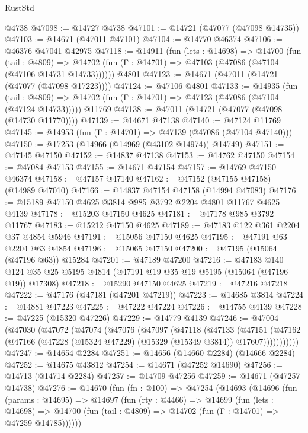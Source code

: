 \begin{lexlean}{RustStd}
\begin{coremodule}
    @4738
@47098 := @14727 @4738
@47101 := @14721 (@47077 (@47098 @14735))
@47103 := @14671 (@47011 @47101)
@47104 := @14770 @46374
@47106 := @46376 @47041 @42975
@47118 := @14911
    (fun (lets : @14698) =>
    @14700
      (fun (tail : @4809) =>
      @14702 (fun (Γ : @14701) => @47103 (@47086 (@47104 (@47106 @14731 @14733))))))
    @4801
@47123 := @14671 (@47011 (@14721 (@47077 (@47098 @17223))))
@47124 := @47106 @4801
@47133 := @14935
    (fun (tail : @4809) => @14702 (fun (Γ : @14701) => @47123 (@47086 (@47104 (@47124 @14733)))))
    @11769
@47138 := @47011 (@14721 (@47077 (@47098 (@14730 @11770))))
@47139 := @14671 @47138
@47140 := @47124 @11769
@47145 := @14953 (fun (Γ : @14701) => @47139 (@47086 (@47104 @47140)))
@47150 := @17253 (@14966 (@14969 (@43102 @14974)) @14749)
@47151 := @47145 @47150
@47152 := @14837 @47138
@47153 := @14762 @47150
@47154 := @47084 @47153
@47155 := @14671 @47154
@47157 := @14769 @47150 @46374
@47158 := @47157 @47140
@47162 := @47152 (@47155 @47158) (@14989 @47010)
@47166 := @14837 @47154 @47158 (@14994 @47083)
@47176 := @15189 @47150 @4625 @3814 @985 @3792 @2204 @4801 @11767 @4625 @4139
@47178 := @15203 @47150 @4625
@47181 := @47178 @985 @3792 @11767
@47183 := @15212 @47150 @4625
@47189 := @47183 @122 @361 @2204 @37 @4854 @5946
@47191 := @15056 @47150 @4625
@47195 := @47191 @63 @2204 @63 @4854
@47196 := @15065 @47150
@47200 := @47195 (@15064 (@47196 @63)) @15284
@47201 := @47189 @47200
@47216 := @47183
    @140
    @124
    @35
    @25
    @5195
    @4814
    (@47191 @19 @35 @19 @5195 (@15064 (@47196 @19)) @17308)
@47218 := @15290 @47150 @4625
@47219 := @47216 @47218
@47222 := @47176 (@47181 (@47201 @47219))
@47223 := @14685 @3814
@47224 := @14881 @47223
@47225 := @47222 @47224
@47226 := @14755 @4139
@47228 := @47225 (@15320 @47226)
@47229 := @14779 @4139
@47246 := @47004
    (@47030
      (@47072
        (@47074
          (@47076
            (@47097
              (@47118
                (@47133
                  (@47151
                    (@47162
                      (@47166 (@47228 (@15324 @47229) (@15329 (@15349 @3814)) @17607)))))))))))
@47247 := @14654 @2284
@47251 := @14656 (@14660 @2284) (@14666 @2284)
@47252 := @14675 @43812
@47254 := @14671 (@47252 @14690)
@47256 := @14713 (@14714 @2284)
@47257 := @14709 @47256
@47259 := @14671 (@47257 @14738)
@47276 := @14670
    (fun (fn : @100) =>
    @47254
      (@14693
        (@14696
          (fun (params : @14695) =>
          @14697
            (fun (rty : @4466) =>
            @14699
              (fun (lets : @14698) =>
              @14700 (fun (tail : @4809) => @14702 (fun (Γ : @14701) => @47259 @14785))))))

\end{coremodule}
\end{lexlean}
